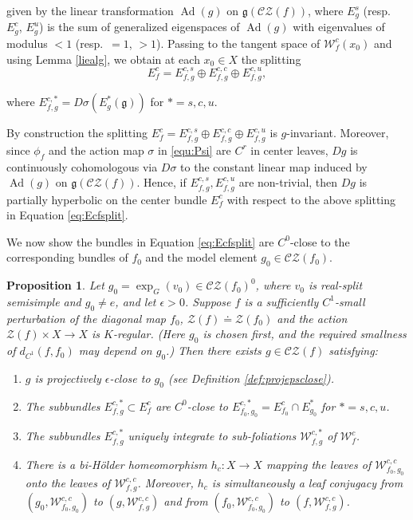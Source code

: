 \documentclass[11pt]{amsart}
\numberwithin{equation}{section}
\newcommand{\CZ}{\mathcal{CZ}}
\theoremstyle{plain}
\newtheorem{prop}[thm]{Proposition}
\begin{document}
given by the linear transformation $\operatorname{Ad}(g)$ on
$\mathfrak g(\CZ(f))$, where $E^s_g$ (resp.\ $E^c_g$, $E^u_g$) is the sum
of generalized eigenspaces of $\operatorname{Ad}(g)$ with eigenvalues of
modulus $<1$ (resp.\ $=1$, $>1$). Passing to the tangent space of
$\mathcal W^c_f(x_0)$ and using Lemma \ref{liealg}, we obtain at each
$x_0\in X$ the splitting
\begin{equation}\label{eq:Ecfsplit}
    E^c_f=E^{c,s}_{f,g}\oplus E^{c,c}_{f,g}\oplus E^{c,u}_{f,g},
\end{equation}

where $E^{c,*}_{f,g}=D\sigma(E^*_g(\mathfrak g))$ for $*=s,c,u$.


By construction the splitting $E^c_f=E^{c,s}_{f,g}\oplus E^{c,c}_{f,g}\oplus E^{c,u}_{f,g}$
is $g$-invariant. Moreover, since  $\phi_f$ and the action map
$\sigma$ in \eqref{equ:Psi} are $C^r$ in center leaves, $Dg$ is
continuously cohomologous via $D\sigma$ to the constant linear map induced by
$\operatorname{Ad}(g)$ on $\mathfrak g(\CZ(f))$. Hence, if $E^{c,s}_{f,g},E^{c,u}_{f,g}$ are non-trivial, then $Dg$ is partially
hyperbolic on the center bundle $E^c_f$ with respect to the above
splitting in Equation \ref{eq:Ecfsplit}.

We now show the bundles in Equation \ref{eq:Ecfsplit} are $C^0$-close to the corresponding bundles of
$f_0$ and the model element $g_0\in\CZ(f_0)$.

\begin{prop}\label{prop:g_0tog}
Let  $g_0=\exp_G(v_0)\in\CZ(f_0)^0$, where $v_0$ is real-split semisimple and $g_0\ne e$, and let $\epsilon>0$. Suppose $f$ is a sufficiently
$C^1$-small perturbation of the diagonal map $f_0$,
$\mathcal Z(f)\doteq \mathcal Z(f_0)$ and the action $\mathcal Z(f)\times X\to X$ is $K$-regular. (Here $g_0$ is chosen first, and the  required smallness of  $d_{C^1}(f,f_0)$ may depend on $g_0$.) Then there exists $g\in\CZ(f)$ satisfying:

\begin{enumerate}
\item $g$ is projectively $\epsilon$-close  to $g_0$ (see Definition \ref{def:projepsclose}).

\item The subbundles $E^{c,*}_{f,g}\subset E^c_f$ are $C^0$-close to
  $E^{c,*}_{f_0,g_0}=E^c_{f_0}\cap E^*_{g_0}$ for $*=s,c,u$.

\item The subbundles $E^{c,*}_{f,g}$ uniquely integrate to sub-foliations
  $\mathcal W^{c,*}_{f,g}$ of $\mathcal W^c_f$.

\item There  is a bi-H\"older  homeomorphism $h_c:X\to X$ mapping the leaves  of
$\mathcal W^{c,c}_{f_0,g_0}$ onto the leaves of
$\mathcal W^{c,c}_{f,g}$.  Moreover, $h_c$ is  simultaneously a leaf
conjugacy  from $(g_0,\mathcal W^{c,c}_{f_0,g_0})$ to
 $(g,\mathcal W^{c,c}_{f,g})$ and from
$(f_0,\mathcal W^{c,c}_{f_0,g_0})$ to
$(f,\mathcal W^{c,c}_{f,g})$.
\end{enumerate}
\end{prop}
\end{document}

